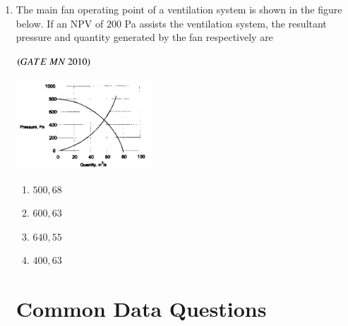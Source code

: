 \documentclass{article}
\begin{document}
\begin{enumerate}[label=Q.\arabic*., itemsep=1em, leftmargin=0pt, itemindent=*, labelsep=0.5em]
\begin{enumerate}[label=Q.\arabic*., start=17, leftmargin=2em]
\begin{enumerate}[label=Q.\arabic*., start=33, leftmargin=2em]
\item The main fan operating point of a ventilation system is shown in the figure below. If an NPV of $200$ Pa assists the ventilation system, the resultant pressure  and quantity  generated by the fan respectively are
\\
\begin{flushright}
\hfill$\left(GATE\ MN\ 2010\right)$
\end{flushright}
\begin{center}
\includegraphics[width=0.4\textwidth]{figs/graph47.png}
\end{center}
\begin{multicols}{4}
\begin{enumerate}[label=(\Alph*),leftmargin=4em]
\item $500,68$
\item $600,63$
\item $640,55$
\item $400,63$
\end{enumerate}
\end{multicols}
\bigskip
\section*{Common Data Questions}

\end{enumerate}
\end{enumerate}
\end{enumerate}
\end{document}
